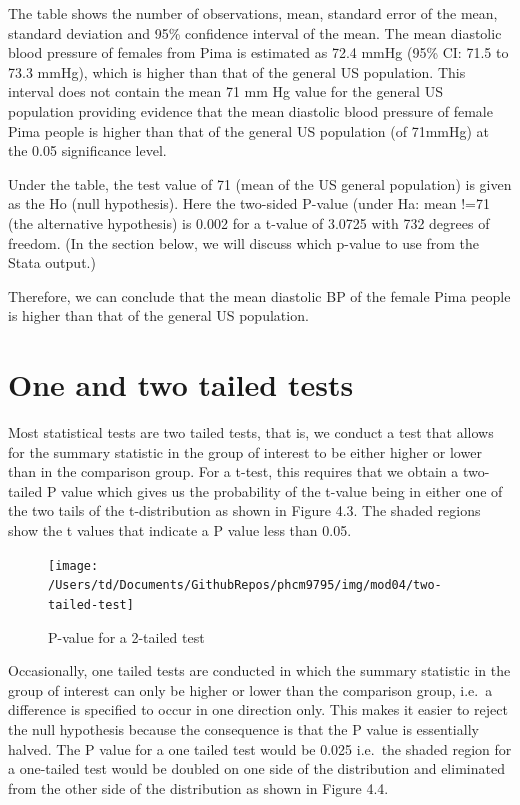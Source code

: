 \documentclass[
]{memoir}
\begin{document}
The table shows the number of observations, mean, standard error of the mean, standard deviation and 95\% confidence interval of the mean. The mean diastolic blood pressure of females from Pima is estimated as 72.4 mmHg (95\% CI: 71.5 to 73.3 mmHg), which is higher than that of the general US population. This interval does not contain the mean 71 mm Hg value for the general US population providing evidence that the mean diastolic blood pressure of female Pima people is higher than that of the general US population (of 71mmHg) at the 0.05 significance level.

Under the table, the test value of 71 (mean of the US general population) is given as the Ho (null hypothesis). Here the two-sided P-value (under Ha: mean !=71 (the alternative hypothesis) is 0.002 for a t-value of 3.0725 with 732 degrees of freedom. (In the section below, we will discuss which p-value to use from the Stata output.)

Therefore, we can conclude that the mean diastolic BP of the female Pima people is higher than that of the general US population.

\hypertarget{one-and-two-tailed-tests}{%
\section{One and two tailed tests}\label{one-and-two-tailed-tests}}

Most statistical tests are two tailed tests, that is, we conduct a test that allows for the summary statistic in the group of interest to be either higher or lower than in the comparison group. For a t-test, this requires that we obtain a two-tailed P value which gives us the probability of the t-value being in either one of the two tails of the t-distribution as shown in Figure 4.3. The shaded regions show the t values that indicate a P value less than 0.05.

\begin{figure}
\texttt{[image: /Users/td/Documents/GithubRepos/phcm9795/img/mod04/two-tailed-test]} \caption{P-value for a 2-tailed test}\label{fig:two-tailed-test}
\end{figure}

Occasionally, one tailed tests are conducted in which the summary statistic in the group of interest can only be higher or lower than the comparison group, i.e.~a difference is specified to occur in one direction only. This makes it easier to reject the null hypothesis because the consequence is that the P value is essentially halved. The P value for a one tailed test would be 0.025 i.e.~the shaded region for a one-tailed test would be doubled on one side of the distribution and eliminated from the other side of the distribution as shown in Figure 4.4.
\end{document}
